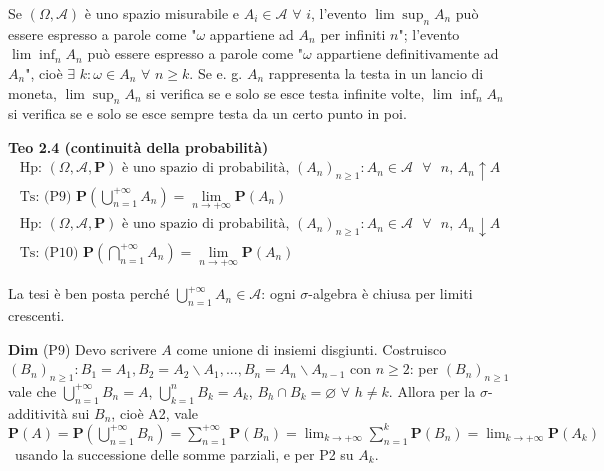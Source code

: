 \documentclass{article}
\begin{document}
Se $\left( \Omega ,\mathcal{A}\right) $ \`{e} uno spazio misurabile e $%
A_{i}\in \mathcal{A}$ $\forall $ $i$, l'evento $\lim \sup_{n}A_{n}$ pu\`{o}
essere espresso a parole come "$\omega $ appartiene ad $A_{n}$ per infiniti $%
n$"; l'evento $\lim \inf_{n}A_{n}$ pu\`{o} essere espresso a parole come "$%
\omega $ appartiene definitivamente ad $A_{n}$", cio\`{e} $\exists $ $%
k:\omega \in A_{n}$ $\forall $ $n\geq k$. Se e. g. $A_{n}$ rappresenta la
testa in un lancio di moneta, $\lim \sup_{n}A_{n}$ si verifica se e solo se
esce testa infinite volte, $\lim \inf_{n}A_{n}$ si verifica se e solo se
esce sempre testa da un certo punto in poi.

\textbf{Teo 2.4 (continuit\`{a} della probabilit\`{a})}
\begin{gather*}
\text{Hp}\text{: }\left( \Omega ,\mathcal{A},\mathbf{P}\right) \text{ \`{e}
uno spazio di probabilit\`{a}, }\left( A_{n}\right) _{n\geq 1}:A_{n}\in 
\mathcal{A}\text{ }\forall \text{ }n\text{, }A_{n}\uparrow A \\
\text{Ts}\text{: (P9) }\mathbf{P}\left( \bigcup_{n=1}^{+\infty }A_{n}\right)
=\lim_{n\rightarrow +\infty }\mathbf{P}\left( A_{n}\right) \\
\text{Hp}\text{: }\left( \Omega ,\mathcal{A},\mathbf{P}\right) \text{ \`{e}
uno spazio di probabilit\`{a}, }\left( A_{n}\right) _{n\geq 1}:A_{n}\in 
\mathcal{A}\text{ }\forall \text{ }n\text{, }A_{n}\downarrow A \\
\text{Ts}\text{: (P10) }\mathbf{P}\left( \bigcap_{n=1}^{+\infty
}A_{n}\right) =\lim_{n\rightarrow +\infty }\mathbf{P}\left( A_{n}\right)
\end{gather*}

La tesi \`{e} ben posta perch\'{e} $\bigcup_{n=1}^{+\infty }A_{n}\in 
\mathcal{A}$: ogni $\sigma $-algebra \`{e} chiusa per limiti crescenti.

\textbf{Dim} (P9) Devo scrivere $A$ come unione di insiemi disgiunti.
Costruisco $\left( B_{n}\right) _{n\geq 1}:B_{1}=A_{1},B_{2}=A_{2}\backslash
A_{1},...,B_{n}=A_{n}\backslash A_{n-1}$ con $n\geq 2$: per $\left(
B_{n}\right) _{n\geq 1}$ vale che $\bigcup_{n=1}^{+\infty }B_{n}=A$, $%
\bigcup_{k=1}^{n}B_{k}=A_{k}$, $B_{h}\cap B_{k}=\varnothing $ $\forall $ $%
h\neq k$. Allora per la $\sigma $-additivit\`{a} sui $B_{n}$, cio\`{e} A2,
vale $\mathbf{P}\left( A\right) =\mathbf{P}\left( \bigcup_{n=1}^{+\infty
}B_{n}\right) =\sum_{n=1}^{+\infty }\mathbf{P}\left( B_{n}\right)
=\lim_{k\rightarrow +\infty }\sum_{n=1}^{k}\mathbf{P}\left( B_{n}\right)
=\lim_{k\rightarrow +\infty }\mathbf{P}\left( A_{k}\right) $\ usando la
successione delle somme parziali, e per P2 su $A_{k}$.
\end{document}
